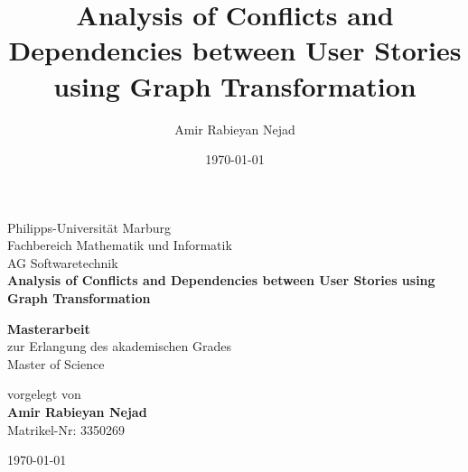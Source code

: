 \documentclass[11pt,a4paper]{article}
\title{Analysis of Conflicts and Dependencies between User Stories using Graph Transformation}
\author{Amir Rabieyan Nejad}
\date{\today}
\numberwithin{equation}{section}
\begin{document}
\begin{titlepage}
    \begin{center}
        \vspace*{1cm}
        \Large
        Philipps-Universität Marburg\\
        Fachbereich Mathematik und Informatik\\
        AG Softwaretechnik \\
        \vspace*{1cm}
        \Large
        \textbf{Analysis of Conflicts and Dependencies between User Stories using Graph Transformation}
            
      
        \vspace{1.5cm}
            
        \textbf{Masterarbeit}\\
        zur Erlangung des akademischen Grades \\
        Master of Science
        
        \vspace{1.5cm}
        vorgelegt von\\
        \textbf{Amir Rabieyan Nejad}\\
        Matrikel-Nr: 3350269
            
    
            
        \vspace{1.5cm}
            
        
            
        
        
        \today\\
        
    \end{center}
\end{titlepage}
\pagestyle{empty}
\newpage\null\newpage

\newpage\null\newpage


\newpage
\pagestyle{plain}
\tableofcontents
\newpage\null\newpage









\newpage



   
\end{document}
